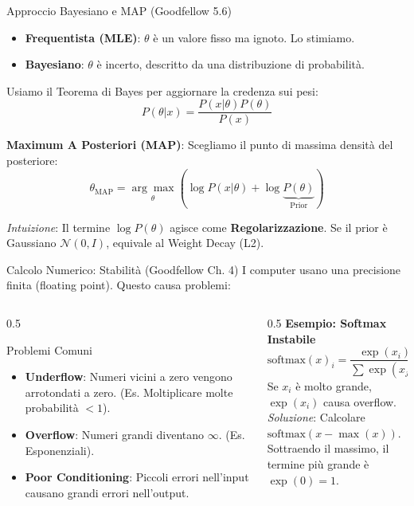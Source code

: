 \documentclass[aspectratio=169, 10pt]{beamer}
\begin{document}
\begin{frame}{Approccio Bayesiano e MAP (Goodfellow 5.6)}
    \begin{itemize}
        \item \textbf{Frequentista (MLE)}: $\theta$ è un valore fisso ma ignoto. Lo stimiamo.
        \item \textbf{Bayesiano}: $\theta$ è incerto, descritto da una distribuzione di probabilità.
    \end{itemize}
    
    Usiamo il Teorema di Bayes per aggiornare la credenza sui pesi:
    \[ P(\theta | x) = \frac{P(x | \theta) P(\theta)}{P(x)} \]
    
    \textbf{Maximum A Posteriori (MAP)}:
    Scegliamo il punto di massima densità del posteriore:
    \[ \theta_{\text{MAP}} = \underset{\theta}{\arg\max} \left( \log P(x | \theta) + \log \underbrace{P(\theta)}_{\text{Prior}} \right) \]
    
    \small \emph{Intuizione}: Il termine $\log P(\theta)$ agisce come \textbf{Regolarizzazione}. Se il prior è Gaussiano $\mathcal{N}(0, I)$, equivale al Weight Decay (L2).
\end{frame}

\begin{frame}{Calcolo Numerico: Stabilità (Goodfellow Ch. 4)}
    I computer usano una precisione finita (floating point). Questo causa problemi:
    \begin{columns}[T]
        \begin{column}{0.5\textwidth}
            \begin{block}{Problemi Comuni}
                \begin{itemize}
                    \item \textbf{Underflow}: Numeri vicini a zero vengono arrotondati a zero. (Es. Moltiplicare molte probabilità $<1$).
                    \item \textbf{Overflow}: Numeri grandi diventano $\infty$. (Es. Esponenziali).
                    \item \textbf{Poor Conditioning}: Piccoli errori nell'input causano grandi errori nell'output.
                \end{itemize}
            \end{block}
        \end{column}
        \begin{column}{0.5\textwidth}
            \textbf{Esempio: Softmax Instabile}
            \[ \text{softmax}(x)_i = \frac{\exp(x_i)}{\sum \exp(x_j)} \]
            Se $x_i$ è molto grande, $\exp(x_i)$ causa overflow.
            \\
            \vspace{0.5em}
            \emph{Soluzione}: Calcolare $\text{softmax}(x - \max(x))$.
            \\Sottraendo il massimo, il termine più grande è $\exp(0)=1$.
        \end{column}
    \end{columns}
\end{frame}
\end{document}
